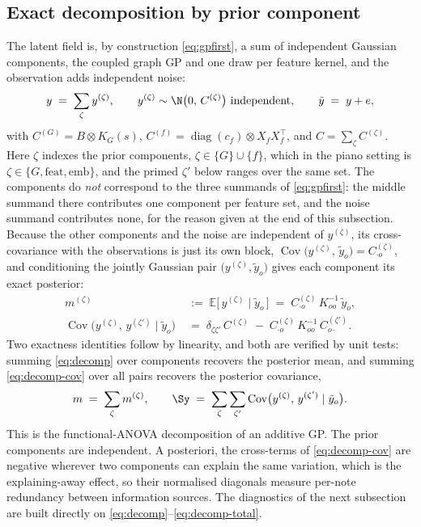\subsection{Exact decomposition by prior component}
The latent field is, by construction \eqref{eq:gpfirst}, a sum of
independent Gaussian components, the coupled graph GP and one draw per
feature kernel, and the observation adds independent noise:
\begin{equation}
  y \;=\; \sum_{\zeta} y^{(\zeta)}, \qquad
  y^{(\zeta)} \sim \N\bigl(0,\, C^{(\zeta)}\bigr) \text{ independent}, \qquad
  \tilde y \;=\; y + e,
  \label{eq:components}
\end{equation}
with $C^{(G)} = B \otimes K_G(s)$, $C^{(f)} = \operatorname{diag}(c_f)
\otimes X_f X_f^{\top}$, and $C = \sum_\zeta C^{(\zeta)}$. Here $\zeta$ indexes the
prior components, $\zeta \in \{G\} \cup \{f\}$, which in the piano setting
is $\zeta \in \{G, \mathrm{feat}, \mathrm{emb}\}$, and the primed $\zeta'$
below ranges over the same set. The components do \emph{not} correspond to
the three summands of \eqref{eq:gpfirst}: the middle summand there
contributes one component per feature set, and the noise summand contributes
none, for the reason given at the end of this subsection. Because the other
components and the noise are independent of $y^{(\zeta)}$, its
cross-covariance with the observations is just its own block,
$\operatorname{Cov}\bigl(y^{(\zeta)},\, \tilde y_o\bigr) = C^{(\zeta)}_{\cdot o}$,
and conditioning the jointly Gaussian pair $\bigl(y^{(\zeta)}, \tilde y_o\bigr)$
gives each component its exact posterior:
\begin{align}
  m^{(\zeta)} \;&:=\; \mathbb{E}\bigl[\, y^{(\zeta)} \mid \tilde y_o \,\bigr]
  \;=\; C^{(\zeta)}_{\cdot o}\, K_{oo}^{-1}\, \tilde y_o,
  \label{eq:decomp}\\[2pt]
  \operatorname{Cov}\bigl(y^{(\zeta)},\, y^{(\zeta')} \mid \tilde y_o\bigr)
  \;&=\; \delta_{\zeta\zeta'}\, C^{(\zeta)}
  \;-\; C^{(\zeta)}_{\cdot o}\, K_{oo}^{-1}\, C^{(\zeta')}_{o \cdot}.
  \label{eq:decomp-cov}
\end{align}
Two exactness identities follow by linearity, and both are verified by unit
tests: summing \eqref{eq:decomp} over components recovers the posterior mean,
and summing \eqref{eq:decomp-cov} over all pairs recovers the posterior
covariance,
\begin{equation}
  m \;=\; \sum_\zeta m^{(\zeta)}, \qquad
  \Sy \;=\; \sum_{\zeta}\sum_{\zeta'}
  \operatorname{Cov}\bigl(y^{(\zeta)},\, y^{(\zeta')} \mid \tilde y_o\bigr).
  \label{eq:decomp-total}
\end{equation}
This is the functional-ANOVA decomposition of an additive GP. The prior
components are independent. A posteriori, the cross-terms of
\eqref{eq:decomp-cov} are negative wherever two components can explain the
same variation, which is the explaining-away effect, so their normalised
diagonals measure per-note redundancy between information sources. The
diagnostics of the next subsection are built directly on
\eqref{eq:decomp}--\eqref{eq:decomp-total}.

